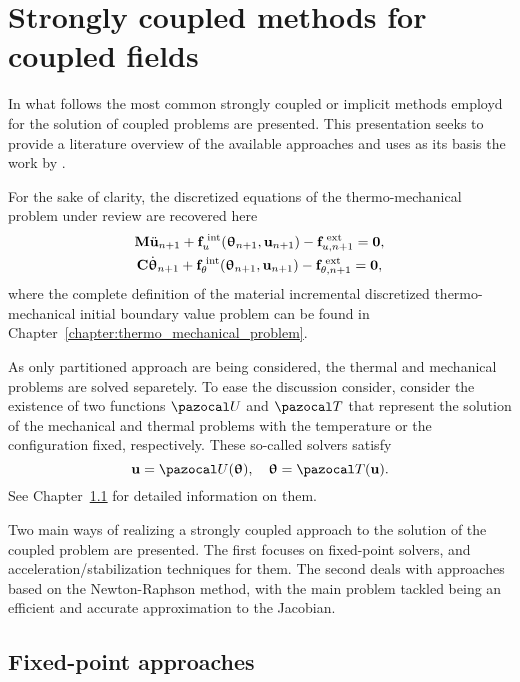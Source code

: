 \chapter{Strongly coupled methods for coupled fields}

In what follows the most common strongly coupled or implicit methods employd for the solution of coupled problems are presented.
This presentation seeks to provide a literature overview of the available approaches and uses as its basis the work by \cite{gatzhammer_efficient_2014}.

For the sake of clarity, the discretized equations of the thermo-mechanical problem under review are recovered here
\begin{gather}
    \mathbf M \ddot{\mathbf u}_{n+1} +\mathbf f_u^\text{\;int}(\bm \uptheta_{n+1}, \mathbf u_{n+1})-\mathbf f^\text{\;ext}_{u,n+1}=\mathbf 0, \label{eq:mech_problem}\\
    \mathbf C \dot{\bm \uptheta}_{n+1} +\mathbf f_\theta^\text{\;int}(\bm \uptheta_{n+1}, \mathbf u_{n+1})-\mathbf f^\text{\;ext}_{\theta,n+1}=\mathbf 0, \label{eq:therm_problem}
\end{gather}
where the complete definition of the material incremental discretized thermo-mechanical initial boundary value problem can be found in Chapter~\ref{chapter:thermo_mechanical_problem}.

As only partitioned approach are being considered, the thermal and mechanical problems are solved separetely.
To ease the discussion consider, consider the existence of two functions \(\pazocal U\) and \(\pazocal T\) that represent the solution of the mechanical and thermal problems with the temperature or the configuration fixed, respectively.
These so-called solvers satisfy
\begin{equation}
  \mathbf u = \pazocal U(\bm \uptheta),\quad
  \bm \uptheta = \pazocal T(\mathbf u).
\end{equation}
See Chapter~\ref{} for detailed information on them.

Two main ways of realizing a strongly coupled approach to the solution of the coupled problem are presented.
The first focuses on fixed-point solvers, and acceleration/stabilization techniques for them.
The second deals with approaches based on the Newton-Raphson method, with the main problem tackled being an efficient and accurate approximation to the Jacobian.


\section{Fixed-point approaches}

